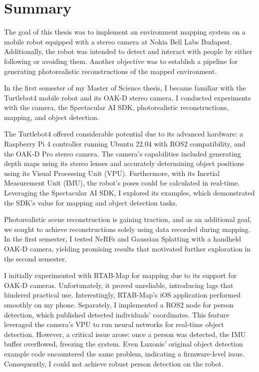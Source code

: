 \chapter{Summary} \label{summary}

The goal of this thesis was to implement an environment mapping system on a mobile robot equipped with a stereo camera at Nokia Bell Labs Budapest. Additionally, the robot was intended to detect and interact with people by either following or avoiding them. Another objective was to establish a pipeline for generating photorealistic reconstructions of the mapped environment.

In the first semester of my Master of Science thesis, I became familiar with the Turtlebot4 mobile robot and its OAK-D stereo camera. I conducted experiments with the camera, the Spectacular AI SDK, photorealistic reconstructions, mapping, and object detection.

The Turtlebot4 offered considerable potential due to its advanced hardware: a Raspberry Pi 4 controller running Ubuntu 22.04 with ROS2 compatibility, and the OAK-D Pro stereo camera. The camera's capabilities included generating depth maps using its stereo lenses and accurately determining object positions using its Visual Processing Unit (VPU). Furthermore, with its Inertial Measurement Unit (IMU), the robot's poses could be calculated in real-time. Leveraging the Spectacular AI SDK, I explored its examples, which demonstrated the SDK's value for mapping and object detection tasks.

Photorealistic scene reconstruction is gaining traction, and as an additional goal, we sought to achieve reconstructions solely using data recorded during mapping. In the first semester, I tested NeRFs and Gaussian Splatting with a handheld OAK-D camera, yielding promising results that motivated further exploration in the second semester.

I initially experimented with RTAB-Map for mapping due to its support for OAK-D cameras. Unfortunately, it proved unreliable, introducing lags that hindered practical use. Interestingly, RTAB-Map's iOS application performed smoothly on my phone. Separately, I implemented a ROS2 node for person detection, which published detected individuals' coordinates. This feature leveraged the camera's VPU to run neural networks for real-time object detection. However, a critical issue arose: once a person was detected, the IMU buffer overflowed, freezing the system. Even Luxonis’ original object detection example code encountered the same problem, indicating a firmware-level issue. Consequently, I could not achieve robust person detection on the robot.

